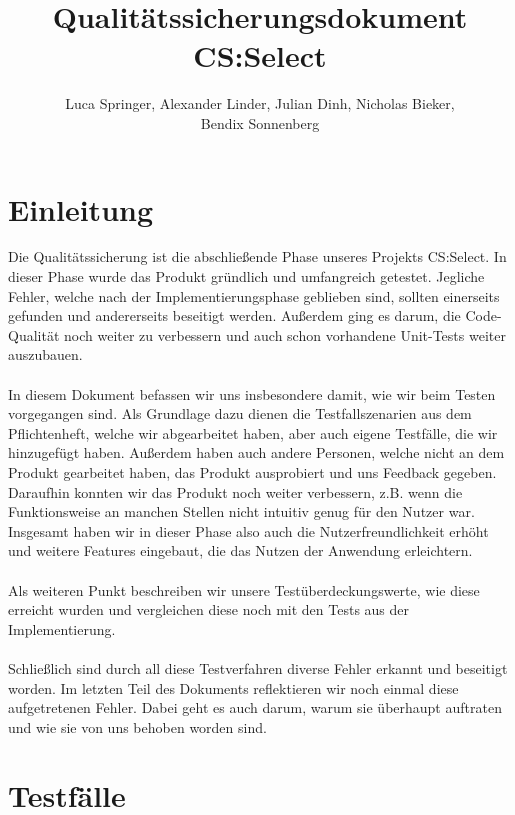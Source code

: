 \documentclass[a4paper]{scrreprt}
\begin{document}
    \title{Qualitätssicherungsdokument CS:Select}
    \author{Luca Springer, Alexander Linder, Julian Dinh, Nicholas Bieker,\\ Bendix Sonnenberg}
    \maketitle

    \tableofcontents
    \chapter{Einleitung}
    Die Qualitätssicherung ist die abschließende Phase unseres Projekts CS:Select. In dieser Phase wurde das Produkt
    gründlich und umfangreich getestet. Jegliche Fehler, welche nach der Implementierungsphase geblieben sind, sollten einerseits
    gefunden und andererseits beseitigt werden. Außerdem ging es darum,
    die Code-Qualität noch weiter zu verbessern und auch schon vorhandene Unit-Tests weiter auszubauen. \\
    \\
    In diesem Dokument befassen wir uns insbesondere damit, wie wir beim Testen vorgegangen sind. Als Grundlage dazu
    dienen die Testfallszenarien aus dem Pflichtenheft, welche wir abgearbeitet haben, aber auch eigene Testfälle, die wir hinzugefügt haben. Außerdem
    haben auch andere Personen, welche nicht an dem Produkt gearbeitet haben, das Produkt ausprobiert und uns Feedback gegeben. Daraufhin
    konnten wir das Produkt noch weiter verbessern, z.B. wenn die Funktionsweise an manchen Stellen nicht intuitiv genug für den Nutzer war.
    Insgesamt haben wir in dieser Phase also auch die Nutzerfreundlichkeit erhöht und weitere Features eingebaut, die das Nutzen der Anwendung erleichtern. \\
    \\
    Als weiteren Punkt beschreiben wir unsere Testüberdeckungswerte, wie diese erreicht wurden und vergleichen diese noch mit den Tests aus der Implementierung. \\
    \\
    Schließlich sind durch all diese Testverfahren diverse Fehler erkannt und beseitigt worden. Im letzten Teil des Dokuments
    reflektieren wir noch einmal diese aufgetretenen Fehler. Dabei geht es auch darum, warum sie überhaupt auftraten
    und wie sie von uns behoben worden sind.





    \chapter{Testfälle}
\end{document}
